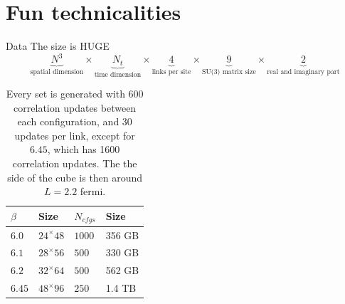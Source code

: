 \documentclass[10pt]{beamer}
\begin{document}
\section{Fun technicalities}
\begin{frame}{Data}
	The size is HUGE
	\begin{equation}\nonumber
		\underbrace{N^3}_\text{spatial dimension} \times
		\underbrace{N_t}_\text{time dimension} \times
		\underbrace{4}_\text{links per site} \times 
		\underbrace{9}_\text{SU(3) matrix size} \times
		\underbrace{2}_\text{real and imaginary part}
	\end{equation}
	\begin{table}
		\caption{Every set is generated with 600 correlation updates between each configuration, and 30 updates per link, except for $6.45$, which has 1600 correlation updates. The the side of the cube is then around $L=2.2$ fermi.}
		\begin{tabular}{l | l | l | l}
			$\beta$ & Size & $N_{cfgs}$ & Size \\ \hline
			$6.0$ & $24^\times 48$ & $1000$ & 356 GB \\
			$6.1$ & $28^\times 56$ & $500$ & 330 GB\\
			$6.2$ & $32^\times 64$ & $500$ & 562 GB\\
			$6.45$ & $48^\times 96$ & $250$ & 1.4 TB\\
		\end{tabular}
		\label{tab:data_batches}
	\end{table}
\end{frame}
\end{document}
